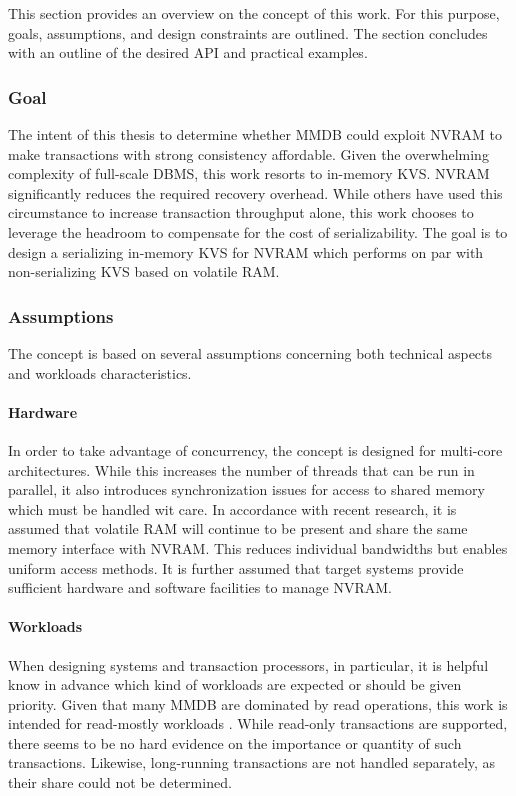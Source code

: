 This section provides an overview on the concept of this work. For this purpose,
goals, assumptions, and design constraints are outlined. The section concludes
with an outline of the desired API and practical examples.

\subsubsection{Goal}

The intent of this thesis to determine whether MMDB could exploit NVRAM to make
transactions with strong consistency affordable. Given the overwhelming
complexity of full-scale DBMS, this work resorts to in-memory KVS. NVRAM
significantly reduces the required recovery overhead. While others have used
this circumstance to increase transaction throughput alone, this work chooses to
leverage the headroom to compensate for the cost of serializability. The goal is
to design a serializing in-memory KVS for NVRAM which performs on par with
non-serializing KVS based on volatile RAM.

\subsubsection{Assumptions}

The concept is based on several assumptions concerning both technical aspects
and workloads characteristics.

\paragraph{Hardware}

In order to take advantage of concurrency, the concept is designed for
multi-core architectures. While this increases the number of threads that can be
run in parallel, it also introduces synchronization issues for access to shared
memory which must be handled wit care. In accordance with recent research, it is
assumed that volatile RAM will continue to be present and share the same memory
interface with NVRAM. This reduces individual bandwidths but enables uniform
access methods. It is further assumed that target systems provide sufficient
hardware and software facilities to manage NVRAM.

\paragraph{Workloads}

When designing systems and transaction processors, in particular, it is helpful
know in advance which kind of workloads are expected or should be given
priority. Given that many MMDB are dominated by read operations, this work is
intended for read-mostly workloads \cite{andrei2017sap}. While read-only
transactions are supported, there seems to be no hard evidence on the importance
or quantity of such transactions. Likewise, long-running transactions are not
handled separately, as their share could not be determined.

